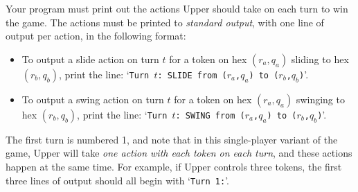 \documentclass[]{article}
\begin{document}
Your program must print out the actions Upper should take on each turn to
win the game.
The actions must be printed to \emph{standard output}\footnotemark,
with one line of output per action, in the following format:
%
\begin{itemize}
    \item
        To output a slide action on turn $t$ for a token on hex $(r_a, q_a)$
        sliding to hex $(r_b, q_b)$, print the line:
    `\texttt{Turn~$t$:\ SLIDE\ from\ ($r_a$,$q_a$)\ to\ ($r_b$,$q_b$)}'.
    \item
        To output a swing action on turn $t$ for a token on hex $(r_a, q_a)$
        swinging to hex $(r_b, q_b)$, print the line:
    `\texttt{Turn~$t$:\ SWING\ from\ ($r_a$,$q_a$)\ to\ ($r_b$,$q_b$)}'.
\end{itemize}
%
The first turn is numbered 1, and note that in this single-player variant of
the game, Upper will take \emph{one action with each token on each turn}, and
these actions happen at the same time.
For example, if Upper controls three tokens, the first three lines of output
should all begin with `\texttt{Turn 1:}'.

\end{document}
